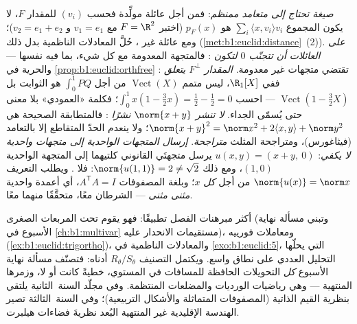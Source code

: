 \begin{remark}
\label{rem:b1:euclid:pitfalls}
\emph{صيغة  تحتاج إلى  متعامد ممنظم}: فمن أجل
عائلة مولِّدة فحسب $(v_i)$ للمقدار $F$، لا يكون المجموع $\sum_i\langle
x, v_i\rangle v_i$ هو $p_F(x)$ (اختبر $F = \R^2$ مع $v_1
= e_1$ و $v_2 = e_1 + e_2$)؛ ومع عائلة غير ، حُلَّ
المعادلات الناظمية بدل ذلك
(\cref{met:b1:euclid:distance}~(2)).
\emph{على العائلات  أن تتجنّب $0$ لتكون }: فالمتجهة
المعدومة  مع كل شيء، بما فيه نفسها ---
والحرية في \cref{prop:b1:euclid:orthfree} تقتضي متجهات
غير معدومة.
\emph{المقدار $F^\perp$ يتعلق }: ففي $\R_1[X]$، ليس
متمم $\operatorname{Vect}(X)$ من أجل $\int_0^1 PQ$
هو الثوابت بل $\operatorname{Vect}(1 - \frac32 X)$ ---
احسب $\int_0^1 x(1 - \frac32 x) = \frac12 - \frac12 = 0$؛
فكلمة «العمودي» بلا معنى حتى يُسمّى الجداء.
\emph{لا تنشر $\norm{x + y}$ نشرًا }: فالمتطابقة
الصحيحة هي $\norm{x+y}^2 = \norm x^2 + 2\langle x, y\rangle +
\norm y^2$؛ ولا ينعدم الحدّ المتقاطع إلا بالتعامد
(فيثاغورس)، ومتراجحة المثلث
\emph{متراجحة}.
\emph{إرسال المتجهات الواحدية إلى متجهات واحدية لا يكفي}:  $u(x,
y) = (x + y,\ 0)$ يرسل متجهتَي  القانوني كلتيهما إلى المتجهة
الواحدية $(1, 0)$، ومع ذلك $\norm{u(1,1)} = 2 \neq \sqrt2$: فلا
. ويطلب التعريف $\norm{u(x)} = \norm x$ من أجل
\emph{كل} $x$؛ وبلغة المصفوفات $A^{\mathsf T}A = I$، أي
أعمدة واحدية \emph{ مثنى مثنى} --- الشرطان
معًا، متحقَّقًا منهما معًا.
\end{remark}

\begin{remark}
\label{rem:b1:euclid:whereused}
 أكثر مبرهنات الفصل تطبيقًا:
فهو يقوم تحت المربعات الصغرى (وتبني مسألة نهاية الأسبوع في
\cref{ch:b1:multivar} مستقيمات الانحدار عليه)، ومعاملات
فورييه (\cref{ex:b1:euclid:trigortho})، والمعادلات
الناظمية في \cref{exo:b1:euclid:5}، التي يحلّها التحليل العددي
على نطاق واسع. ويكتمل التصنيف $R_\theta / S_\theta$
أدناه: فتصنّف مسألة نهاية الأسبوع \emph{كل}
التحويلات الحافظة للمسافات في المستوي، خطيةً كانت أو لا،
وزمرها المنتهية --- وهي رياضيات الورديات والمضلعات
المنتظمة. وفي مجلّد السنة~الثانية يلتقي  بنظرية
القيم الذاتية (المصفوفات المتماثلة والأشكال التربيعية)؛ وفي
السنة~الثالثة تصير الهندسة الإقليدية غير المنتهية البُعد نظريةَ فضاءات
هيلبرت.
\end{remark}

